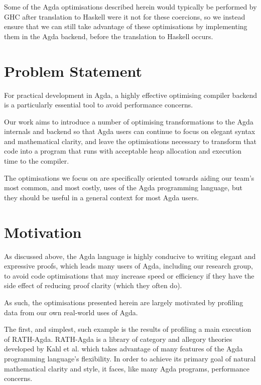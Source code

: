 Some of the Agda optimisations described herein would typically be performed by GHC after translation to Haskell were it not for these coercions, so we instead ensure that we can still take advantage of these optimisations by implementing them in the Agda backend, before the translation to Haskell occurs.

\section{Problem Statement}
\label{sec:problem_statement}

For practical development in Agda, a highly effective optimising compiler backend is a particularly essential tool to avoid performance concerns.

Our work aims to introduce a number of optimising transformations to the Agda internals and backend so that Agda users can continue to focus on elegant syntax and mathematical clarity, and leave the optimisations necessary to transform that code into a program that runs with acceptable heap allocation and execution time to the compiler.

The optimisations we focus on are specifically oriented towards aiding our team's most common, and most costly, uses of the Agda programming language, but they should be useful in a general context for most Agda users.

\section{Motivation}
\label{sec:motivation}

As discussed above, the Agda language is highly conducive to writing elegant and expressive proofs, which leads many users of Agda, including our research group, to avoid code optimisations that may increase speed or efficiency if they have the side effect of reducing proof clarity (which they often do).

As such, the optimisations presented herein are largely motivated by profiling data from our own real-world uses of Agda.

The first, and simplest, such example is the results of profiling a main execution of RATH-Agda. RATH-Agda is a library of category and allegory theories developed by Kahl et al. which takes advantage of many features of the Agda programming language's flexibility.\citep{Kahl-2017_RATH-Agda-2.2} In order to achieve its primary goal of natural mathematical clarity and style, it faces, like many Agda programs, performance concerns.


